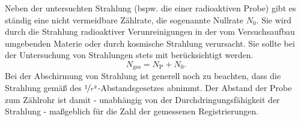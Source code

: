 Neben der untersuchten Strahlung (bspw. die einer radioaktiven Probe) gibt es ständig eine nicht vermeidbare Zählrate, die sogenannte Nullrate $N_0$. Sie wird durch die Strahlung radioaktiver Verunreinigungen in der vom Versuchsaufbau umgebenden Materie oder durch kosmische Strahlung verursacht. Sie sollte bei der Untersuchung von Strahlungen stets mit berücksichtigt werden.
\begin{equation}
N_{\mathrm{ges}} = N_\mathrm{P} + N_0.
\end{equation}
Bei der Abschirmung von Strahlung ist generell noch zu beachten, dass die Strahlung gemäß des $\nicefrac{1}{r^2}$-Abstandsgesetzes abnimmt. Der Abstand der Probe zum Zählrohr ist damit - unabhängig von der Durchdringungsfähigkeit der Strahlung - maßgeblich für die Zahl der gemessenen Registrierungen. \cite{EKS07}